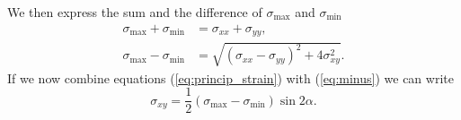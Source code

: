 We then express the sum and the difference of $\sigma_\mathrm{max}$ and $\sigma_\mathrm{min}$
%
\begin{align}
\sigma_{\mathrm{max}}+\sigma_{\mathrm{min}} &= \sigma_{xx}+\sigma_{yy}, \label{eq:plus}\\
\sigma_{\mathrm{max}}-\sigma_{\mathrm{min}} &= \sqrt{\left(\sigma_{xx}-\sigma_{yy}\right)^2+4\sigma_{xy}^2}.\label{eq:minus}
\end{align}
%
If we now combine equations (\ref{eq:princip_strain}) with (\ref{eq:minus}) we can write
%
%
\begin{equation}
\label{eq:nxyVSnprinc}
\sigma_{xy}=\frac{1}{2}\left(\sigma_{\mathrm{max}}-\sigma_{\mathrm{min}}\right)\sin{2\alpha}.
\end{equation}
%

\newpage 